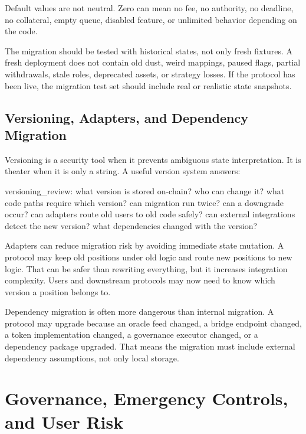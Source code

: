 \begin{failuremodebox}
Default values are not neutral. Zero can mean no fee, no authority, no deadline, no collateral, empty queue, disabled feature, or unlimited behavior depending on the code.
\end{failuremodebox}

The migration should be tested with historical states, not only fresh fixtures. A fresh deployment does not contain old dust, weird mappings, paused flags, partial withdrawals, stale roles, deprecated assets, or strategy losses. If the protocol has been live, the migration test set should include real or realistic state snapshots.

\subsection{Versioning, Adapters, and Dependency Migration}

Versioning is a security tool when it prevents ambiguous state interpretation. It is theater when it is only a string. A useful version system answers:

\begin{codeblock}
versioning_review:
    what version is stored on-chain?
    who can change it?
    what code paths require which version?
    can migration run twice?
    can a downgrade occur?
    can adapters route old users to old code safely?
    can external integrations detect the new version?
    what dependencies changed with the version?
\end{codeblock}

Adapters can reduce migration risk by avoiding immediate state mutation. A protocol may keep old positions under old logic and route new positions to new logic. That can be safer than rewriting everything, but it increases integration complexity. Users and downstream protocols may now need to know which version a position belongs to.

Dependency migration is often more dangerous than internal migration. A protocol may upgrade because an oracle feed changed, a bridge endpoint changed, a token implementation changed, a governance executor changed, or a dependency package upgraded. That means the migration must include external dependency assumptions, not only local storage.

\section{Governance, Emergency Controls, and User Risk}


